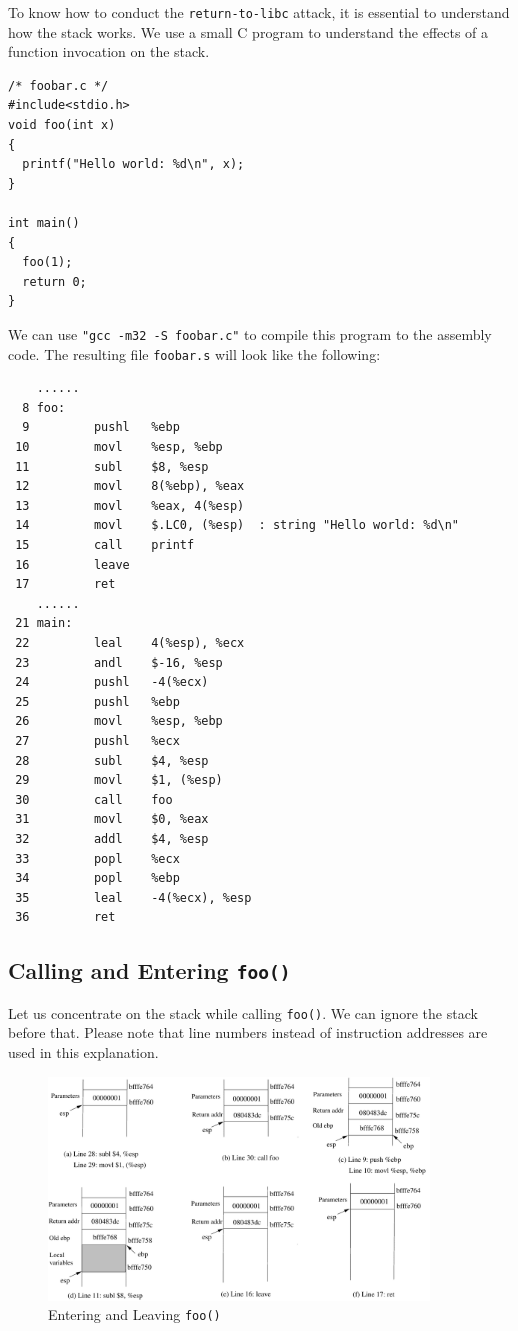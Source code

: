 To know how to conduct the {\tt return-to-libc} attack, it is essential to 
understand how the stack works.  We use a small C program to understand 
the effects of a function invocation on the stack. 
\begin{verbatim}
/* foobar.c */
#include<stdio.h>
void foo(int x)
{
  printf("Hello world: %d\n", x);
}

int main()
{
  foo(1);
  return 0;
}
\end{verbatim}
We can use {\tt "gcc -m32 -S foobar.c"} to
compile this program to the assembly code.
The resulting file {\tt foobar.s} will look like the following:
\begin{verbatim}
    ......
  8 foo:
  9         pushl   %ebp
 10         movl    %esp, %ebp
 11         subl    $8, %esp
 12         movl    8(%ebp), %eax   
 13         movl    %eax, 4(%esp)
 14         movl    $.LC0, (%esp)  : string "Hello world: %d\n"
 15         call    printf
 16         leave
 17         ret
    ......
 21 main:
 22         leal    4(%esp), %ecx
 23         andl    $-16, %esp
 24         pushl   -4(%ecx)
 25         pushl   %ebp
 26         movl    %esp, %ebp
 27         pushl   %ecx
 28         subl    $4, %esp
 29         movl    $1, (%esp)
 30         call    foo
 31         movl    $0, %eax
 32         addl    $4, %esp
 33         popl    %ecx
 34         popl    %ebp
 35         leal    -4(%ecx), %esp
 36         ret
\end{verbatim}

\subsection{Calling and Entering {\tt foo()}}

Let us concentrate on the stack while calling {\tt foo()}. We can ignore the stack
before that. Please note that line numbers instead of instruction addresses are
used in this explanation. 

\begin{figure}[t]
   \begin{center} 
   \includegraphics[width=0.9\textwidth,natwidth=621,natheight=403]{Figs/enter_leave_foo.pdf}
    \end{center}
    \caption{Entering and Leaving {\tt foo()}}
    \label{fig:enter_leave_foo}
\end{figure}



